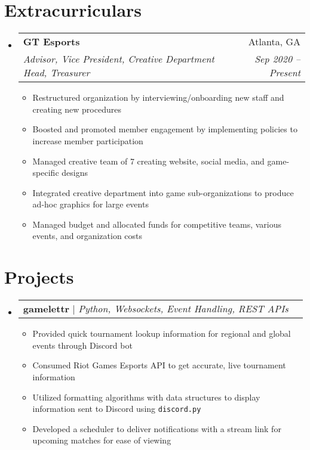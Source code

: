 \documentclass[letter,10pt]{extarticle}
\makeatletter
\newcommand{\resumeItem}[1]{
	\item\small{
		#1 \vspace{-1pt}
	}
}
\newcommand{\resumeProjectHeading}[3]{
	\vspace{-3pt}\item
		\begin{tabular*}{1\linewidth}{l@{\extracolsep{\fill}}r}
			\textbf{#1} $|$ \emph{#2} & #3 \\
		\end{tabular*}\vspace{-3pt}
}
\newcommand{\resumeSubheading}[4]{
	\vspace{-1pt}\item
		\begin{tabular*}{1\linewidth}{l@{\extracolsep{\fill}}r}
			\textbf{#1} & #2 \\
			\textit{#3} & \textit{#4} \\
		\end{tabular*}\vspace{-3pt}
}
\newcommand{\resumeSubHeadingListStart}{\begin{itemize}[leftmargin=0.15in,label={}]}
\newcommand{\resumeSubHeadingListEnd}{\end{itemize}}
\newcommand{\resumeItemListStart}{\begin{itemize}\vspace{-3pt}}
\newcommand{\resumeItemListEnd}{\end{itemize}\vspace{-3pt}}
\makeatother
\begin{document}
\section{Extracurriculars}
	\resumeSubHeadingListStart
        \resumeSubheading
            {GT Esports}
            {Atlanta, GA}
            {Advisor, Vice President, Creative Department Head, Treasurer}
            {Sep 2020 -- Present}
        \resumeItemListStart
            \resumeItem{Restructured organization by interviewing/onboarding new
                staff and creating new procedures}
            \resumeItem{Boosted and promoted member engagement by implementing
                policies to increase member participation}
            \resumeItem{Managed creative team of 7 creating website, social
                media, and game-specific designs}
            \resumeItem{Integrated creative department into game sub-organizations
                to produce ad-hoc graphics for large events}
             \resumeItem{Managed budget and allocated funds for competitive teams, various events,
                and organization costs}
        \resumeItemListEnd
	\resumeSubHeadingListEnd

\section{Projects}
    \resumeSubHeadingListStart
    \vspace{1mm}
        \resumeProjectHeading
            {gamelettr}
            {Python, Websockets, Event Handling, REST APIs}
            {}
            \resumeItemListStart
                \resumeItem{Provided quick tournament lookup information for
                    regional and global events through Discord bot}
                \resumeItem{Consumed Riot Games Esports API to get accurate, live
                    tournament information}
                \resumeItem{Utilized formatting algorithms with data structures to
                    display information sent to Discord using \texttt{discord.py}}
                \resumeItem{Developed a scheduler to deliver notifications with
                    a stream link for upcoming matches for ease of viewing}
            \resumeItemListEnd

    \resumeSubHeadingListEnd
\end{document}
